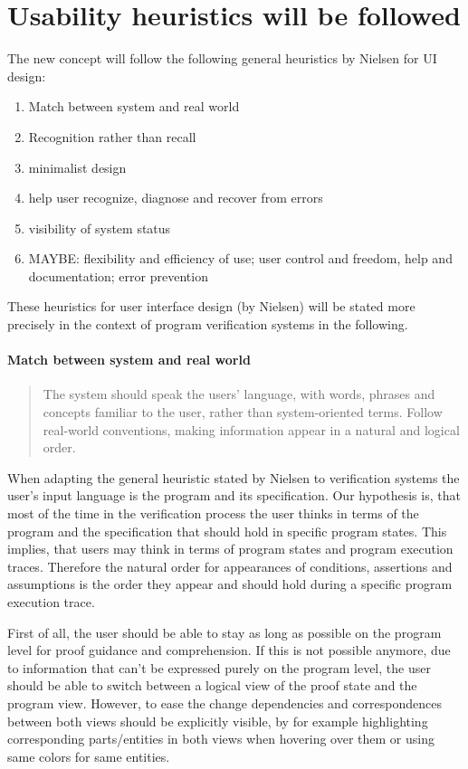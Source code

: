 \documentclass{article}
\begin{document}
\section{Usability heuristics will be followed}

The new concept will follow the following general heuristics by Nielsen for UI 
design:
\begin{enumerate}
 \item Match between system and real world
 \item Recognition rather than recall
 \item minimalist design
 \item help user recognize, diagnose and recover from errors
 \item visibility of system status
 \item MAYBE: flexibility and efficiency of use; user control and freedom, help 
and documentation; error prevention
\end{enumerate}

These heuristics for user interface design (by Nielsen) will be stated more 
precisely in the context of program verification systems in the following.

\paragraph{Match between system and real world}
\begin{quote}
 The system should speak the users' language, with words, phrases and concepts 
familiar to the user, rather than system-oriented terms. Follow real-world 
conventions, making information appear in a natural and logical order.
\end{quote}

When adapting the general heuristic stated by Nielsen to verification systems 
the user's input language is the program and its specification. Our hypothesis 
is, that most of the time in the verification process the user thinks in 
terms of the program and the specification that should hold in specific 
program states. This implies, that users may think in terms of program states 
and program execution traces. Therefore the natural order for appearances of 
conditions, assertions and assumptions is the order they appear and 
should hold during a specific program execution trace.

First of all, the user should be able to stay as long as possible on the 
program level for proof guidance and comprehension. If this is not possible 
anymore, due to information that can't be expressed purely on the program 
level, the user should be able to switch between a logical view of the proof 
state and the program view. However, to ease the change dependencies and 
correspondences between both views should be explicitly visible, by for example 
highlighting corresponding parts/entities in both views when hovering over them 
or using same colors for same entities.
\end{document}
